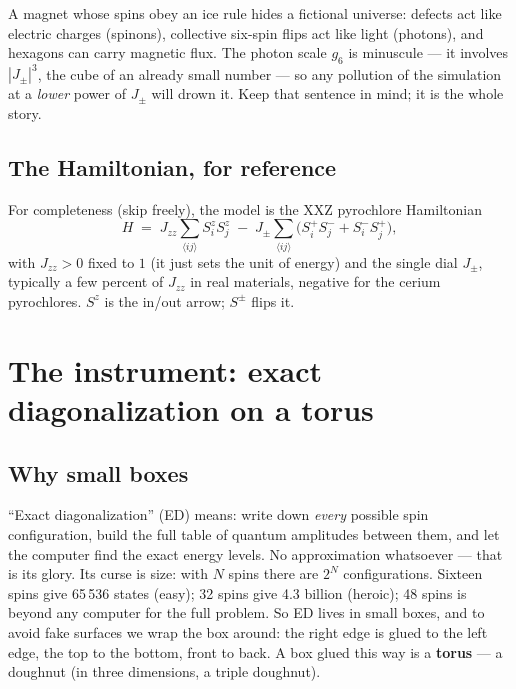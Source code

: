\documentclass[11pt,a4paper]{article}
\newcommand{\Jpm}{J_{\pm}}
\newcommand{\Jzz}{J_{zz}}
\newcommand{\gsix}{g_6}
\begin{document}
\begin{plainwords}
A magnet whose spins obey an ice rule hides a fictional universe: defects act
like electric charges (spinons), collective six-spin flips act like light
(photons), and hexagons can carry magnetic flux.  The photon scale $\gsix$ is
minuscule --- it involves $|\Jpm|^3$, the cube of an already small number ---
so any pollution of the simulation at a \emph{lower} power of $\Jpm$ will
drown it.  Keep that sentence in mind; it is the whole story.
\end{plainwords}

\subsection{The Hamiltonian, for reference}

For completeness (skip freely), the model is the XXZ pyrochlore Hamiltonian
\begin{equation}
H \;=\; \Jzz \sum_{\langle ij\rangle} S^{z}_i S^{z}_j
\;-\; \Jpm \sum_{\langle ij\rangle}\bigl(S^{+}_i S^{-}_j + S^{-}_i S^{+}_j\bigr),
\label{eq:H}
\end{equation}
with $\Jzz>0$ fixed to $1$ (it just sets the unit of energy) and the single
dial $\Jpm$, typically a few percent of $\Jzz$ in real materials, negative for
the cerium pyrochlores.  $S^z$ is the in/out arrow; $S^{\pm}$ flips it.

\section{The instrument: exact diagonalization on a torus}

\subsection{Why small boxes}

``Exact diagonalization'' (ED) means: write down \emph{every} possible spin
configuration, build the full table of quantum amplitudes between them, and
let the computer find the exact energy levels.  No approximation whatsoever
--- that is its glory.  Its curse is size: with $N$ spins there are $2^N$
configurations.  Sixteen spins give 65\,536 states (easy); 32 spins give 4.3
billion (heroic); 48 spins is beyond any computer for the full problem.  So
ED lives in small boxes, and to avoid fake surfaces we wrap the box around:
the right edge is glued to the left edge, the top to the bottom, front to
back.  A box glued this way is a \textbf{torus} --- a doughnut (in three
dimensions, a triple doughnut).
\end{document}
